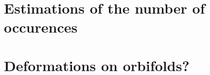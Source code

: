 \section{Estimations of the number of occurences}









\section{Deformations on orbifolds?}












